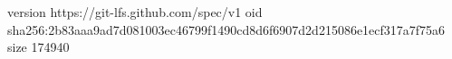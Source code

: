 version https://git-lfs.github.com/spec/v1
oid sha256:2b83aaa9ad7d081003ec46799f1490cd8d6f6907d2d215086e1ecf317a7f75a6
size 174940
